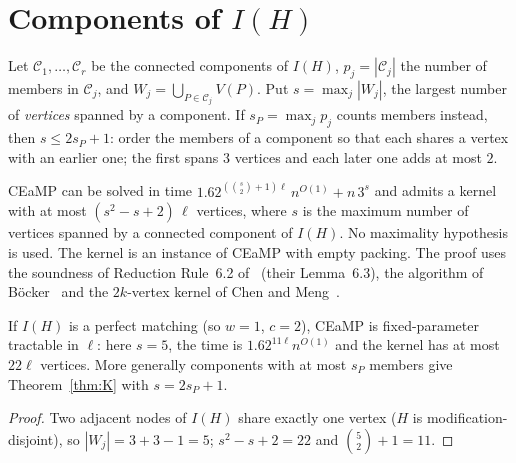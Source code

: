 \section{Components of \texorpdfstring{$I(H)$}{I(H)}}\label{sec:K}
Let $\mathcal C_1,\dots,\mathcal C_r$ be the connected components of $I(H)$, $p_j=|\mathcal C_j|$ the number of members in $\mathcal C_j$, and $W_j=\bigcup_{P\in\mathcal C_j}V(P)$. Put $s=\max_j|W_j|$, the largest number of \emph{vertices} spanned by a component. If $s_P=\max_jp_j$ counts members instead, then $s\le2s_P+1$: order the members of a component so that each shares a vertex with an earlier one; the first spans $3$ vertices and each later one adds at most $2$.

\begin{theorem}\label{thm:K}\sloppy
CEaMP can be solved in time $1.62^{(\binom s2+1)\ell}\,n^{O(1)}+n\,3^{s}$ and admits a kernel with at most $(s^2-s+2)\,\ell$ vertices, where $s$ is the maximum number of vertices spanned by a connected component of $I(H)$. No maximality hypothesis is used. The kernel is an instance of CEaMP with empty packing. The proof uses the soundness of Reduction Rule~6.2 of~\cite{BFK18} (their Lemma~6.3), the algorithm of B\"ocker~\cite{Boe12} and the $2k$-vertex kernel of Chen and Meng~\cite{CM12}.
\end{theorem}

\begin{corollary}\label{cor:pm}
If $I(H)$ is a perfect matching (so $w=1$, $c=2$), CEaMP is fixed-parameter tractable in $\ell$: here $s=5$, the time is $1.62^{11\ell}n^{O(1)}$ and the kernel has at most $22\ell$ vertices. More generally components with at most $s_P$ members give Theorem~\ref{thm:K} with $s=2s_P+1$.
\end{corollary}
\begin{proof}
Two adjacent nodes of $I(H)$ share exactly one vertex ($H$ is modification-disjoint), so $|W_j|=3+3-1=5$; $s^2-s+2=22$ and $\binom52+1=11$.
\end{proof}

